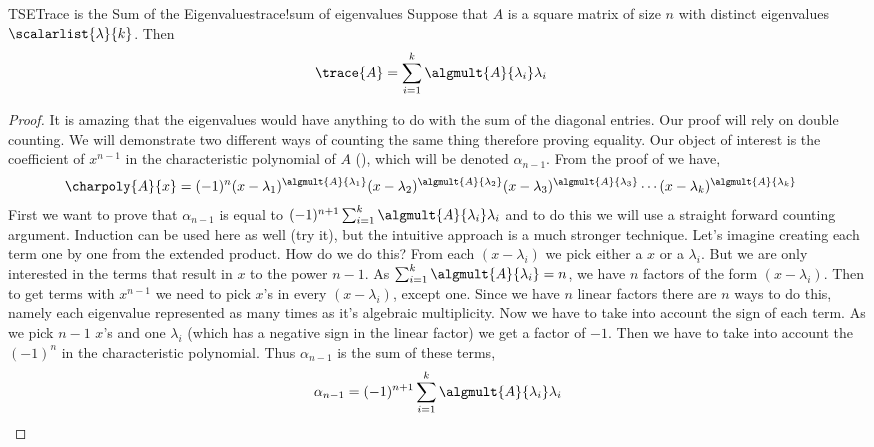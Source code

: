 %
\begin{theorem}{TSE}{Trace is the Sum of the Eigenvalues}{trace!sum of eigenvalues}
Suppose that $A$ is a square matrix of size $n$ with distinct eigenvalues $\scalarlist{\lambda}{k}$.  Then 
%
\begin{align*}
\trace{A}
&=\sum_{i=1}^{k}\algmult{A}{\lambda_i}\lambda_i
\end{align*}
%
\end{theorem}
%
\begin{proof}
It is amazing that the eigenvalues would have anything to do with the sum of the diagonal entries.  Our proof will rely on double counting.  We will demonstrate two different ways of counting the same thing therefore proving equality.  Our object of interest is the coefficient of $x^{n-1}$ in the characteristic polynomial of $A$ (), which will be denoted $\alpha_{n-1}$.  From the proof of  we have,
%
\begin{align*}
\charpoly{A}{x}
&=(-1)^{n}
(x-\lambda_1)^{\algmult{A}{\lambda_1}}
(x-\lambda_2)^{\algmult{A}{\lambda_2}}
(x-\lambda_3)^{\algmult{A}{\lambda_3}}
\cdots
(x-\lambda_k)^{\algmult{A}{\lambda_k}}
\end{align*}
%
First we want to prove that $\alpha_{n-1}$ is equal to $(-1)^{n+1}\sum_{i=1}^{k}\algmult{A}{\lambda_i}\lambda_i$ and to do this we will use a straight forward counting argument. Induction can be used here as well (try it), but the intuitive approach is a much stronger technique. Let's imagine creating each term one by one from the extended product.  How do we do this? From each $(x-\lambda_i)$ we pick either a $x$ or a $\lambda_i$.  But we are only interested in the terms that result in $x$ to the power $n-1$.  As $\sum_{i=1}^k \algmult{A}{\lambda_i}=n$, we have $n$ factors of the form $(x-\lambda_i)$. Then to get terms with $x^{n-1}$ we need to pick $x$'s in every  $(x-\lambda_i)$, except one. Since we have $n$ linear factors there are $n$ ways to do this, namely each eigenvalue represented as many times as it's algebraic multiplicity.  Now we have to take into account the sign of each term. As we pick $n-1$ $x$'s and one $\lambda_i$ (which has a negative sign in the linear factor) we get a factor of $-1$.  Then we have to take into account the $(-1)^{n}$ in the characteristic polynomial. Thus $\alpha_{n-1}$ is the sum of these terms,
%
\begin{align*}
\alpha_{n-1}=(-1)^{n+1}\sum_{i=1}^{k}\algmult{A}{\lambda_i}\lambda_i
\end{align*}

\end{proof}
